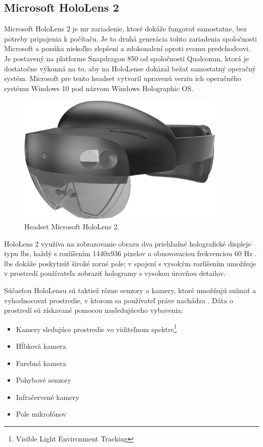 \subsection{Microsoft HoloLens 2}
Microsoft HoloLens 2 je \acrshort{mr} zariadenie, ktoré dokáže fungovať samostatne, bez potreby pripojenia k počítaču. Je to druhá generácia tohto zariadenia spoločnosti 
Microsoft a ponúka niekoľko zlepšení a zdokonalení oproti svomu predchodcovi. Je postavený na platforme Snapdragon 850 od spoločnosti Qualcomm, ktorá je dostatočne
výkonná na to, aby na HoloLense dokázal bežať samostatný operačný systém. Microsoft pre tento headset vytvoril upravenú verziu ich operačného systému Windows 10 pod
názvom Windows Holographic OS. 

\begin{figure}[!htbp]
  \centering
  \includegraphics[width=10cm]{img/microsofthololens2.png}
  \caption{Headset Microsoft HoloLens 2.}
  \label{hololens}
\end{figure}	

HoloLens 2 využíva na zobrazovanie obrazu dva priehľadné holografické displeje typu \acrshort{lbs}, každý s rozlíšením 1440x936 pixelov a obnovovaciou frekvenciou
 60 Hz \cite{MicrosoftHoloLensFull}. 
\acrshort{lbs} dokáže poskytnúť široké zorné pole; v spojení s vysokým rozlíšením umožňuje v prostredí používateľa zobraziť hologramy s vysokou úrovňou detailov.

Súčasťou HoloLensu sú taktiež rôzne senzory a kamery, ktoré umožňujú snímať a vyhodnocovať prostredie, v ktorom sa používateľ práve nachádza \cite{AdvancingMRExperience}. 
Dáta o prostredí sú získavané pomocou nasledujúceho vybavenia:
\begin{itemize}
  \item Kamery sledujúce prostredie vo viditeľnom spektre\footnote{Visible Light Environment Tracking}
  \item Hĺbková kamera
  \item Farebná kamera
  \item Pohybové senzory
  \item Infračervené kamery
  \item Pole mikrofónov  
\end{itemize}

